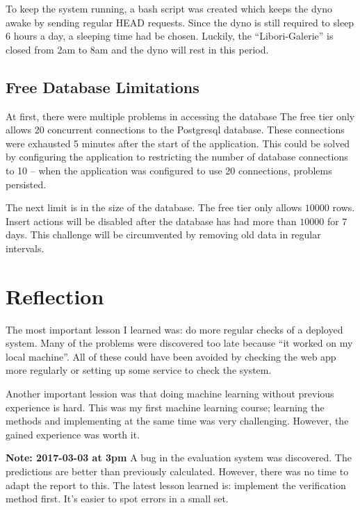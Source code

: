 \documentclass[journal,10pt]{IEEEtran}
\begin{document}
To keep the system running, a bash script was created which keeps the dyno awake by sending regular HEAD requests. Since the dyno is still required to sleep 6 hours a day, a sleeping time had be chosen. Luckily, the ``Libori-Galerie'' is closed from 2am to 8am and the dyno will rest in this period. 

\subsection{Free Database Limitations}
At first, there were multiple problems in accessing the database The free tier only allows 20 concurrent connections to the Postgresql database. These connections were exhausted 5 minutes after the start of the application. This could be solved by configuring the application to restricting the number of database connections to 10 -- when the application was configured to use 20 connections, problems persisted.

The next limit is in the size of the database. The free tier only allows \(10000\) rows. Insert actions will be disabled after the database has had more than \(10000\) for 7 days. This challenge will be circumvented by removing old data in regular intervals.


\section{Reflection}

The most important lesson I learned was: do more regular checks of a deployed system. Many of the problems were discovered too late because ``it worked on my local machine''. All of these could have been avoided by checking the web app more regularly or setting up some service to check the system.

Another important lession was that doing machine learning without previous experience is hard. This was my first machine learning course; learning the methods and implementing at the same time was very challenging. However, the gained experience was worth it.

\textbf{Note: 2017-03-03 at 3pm} A bug in the evaluation system was discovered. The predictions are better than previously calculated. However, there was no time to adapt the report to this. The latest lesson learned is: implement the verification method first. It's easier to spot errors in a small set.

  

\end{document}
